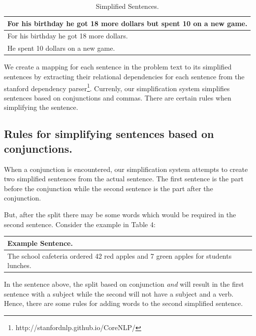 \documentclass[11pt]{article}
\begin{document}
\begin{table}[h!]
\centering
\begin{tabular}{ | m{25em} | }
\hline
 \textbf{For his birthday he got 18 more dollars but spent 10 on a new game.}\\
\hline
 For his birthday he got 18 more dollars.\\
\hline
He spent 10 dollars on a new game.\\
\hline
\end{tabular}
\caption{Simplified Sentences.}
\label{table:7}
\end{table}

We create a mapping for each sentence in the problem text to its simplified sentences by extracting their relational dependencies for each sentence from the stanford dependency parser\footnote{http://stanfordnlp.github.io/CoreNLP/ }. Currenly, our simplification system simplifies sentences based on conjunctions and commas. There are certain rules when simplifying the sentence.

\subsection{Rules for simplifying sentences based on conjunctions.}
 When a conjunction is encountered, our simplification system attempts to create two simplified sentences from the actual sentence. The first sentence is the part before the conjunction while the second sentence is the part after the conjunction.

But, after the split there may be some words which would be required in the second sentence. Consider the example in Table 4:

\begin{table}[h!]
\centering
\begin{tabular}{ | m{25em} | }
\hline
 \textbf{Example Sentence.}\\
\hline
The school cafeteria ordered 42 red apples and 7 green apples for students lunches.\\
\hline
\end{tabular}
\label{table:8}
\end{table}

In the sentence above, the split based on conjunction \textit{and} will result in the first sentence with a subject while the second will not have a subject and a verb. Hence, there are some rules for adding words to the second simplified sentence.
\end{document}
